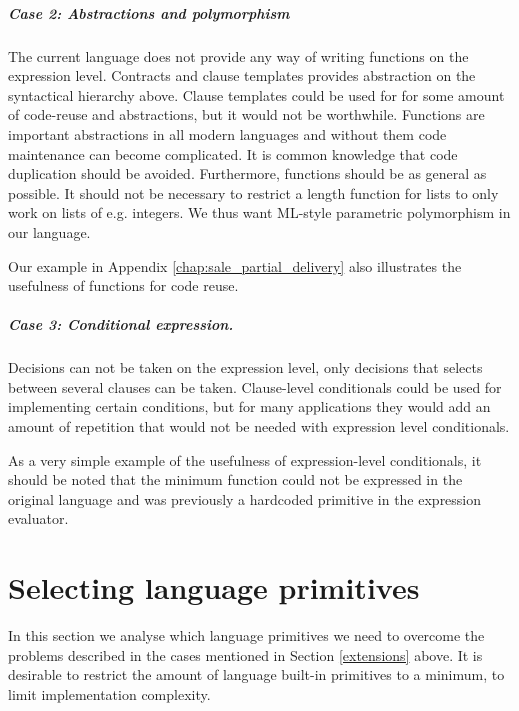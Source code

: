 \documentclass[10pt,a4paper,final,oneside,openany,article]{memoir}
\begin{document}
\paragraph{Case 2: Abstractions and polymorphism} The current language
does not provide any way of writing functions on the expression
level. Contracts and clause templates provides abstraction on the
syntactical hierarchy above. Clause templates could be used for for
some amount of code-reuse and abstractions, but it would not be
worthwhile. Functions are important abstractions in all modern
languages and without them code maintenance can become complicated. It
is common knowledge that code duplication should be avoided.
Furthermore, functions should be as general as possible. It should not
be necessary to restrict a length function for lists to only work on
lists of e.g. integers. We thus want ML-style parametric polymorphism
in our language.

Our example in Appendix \ref{chap:sale_partial_delivery} also
illustrates the usefulness of functions for code reuse.

\paragraph{Case 3: Conditional expression.} Decisions can not be taken
on the expression level, only decisions that selects between several
clauses can be taken. Clause-level conditionals could be used for
implementing certain conditions, but for many applications they would
add an amount of repetition that would not be needed with expression
level conditionals.

As a very simple example of the usefulness of expression-level
conditionals, it should be noted that the minimum function could not
be expressed in the original language and was previously a hardcoded
primitive in the expression evaluator.

\chapter{Selecting language primitives}
\label{primitives}
In this section we analyse which language primitives we need to
overcome the problems described in the cases mentioned in
Section \ref{extensions} above. It is desirable to restrict the amount of
language built-in primitives to a minimum, to limit implementation
complexity.
\end{document}
